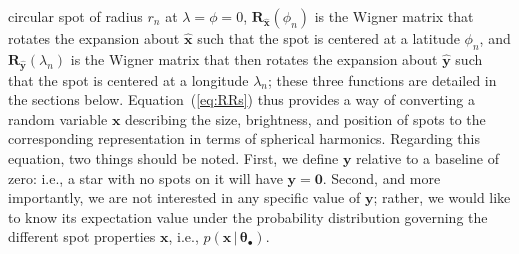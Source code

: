 \documentclass[modern]{aastex62}
\begin{document}
circular spot of radius $r_n$ at $\lambda = \phi = 0$,
$\mathbf{R}_{\hat{\mathbf{x}}}(\phi_n)$ is the Wigner matrix that rotates the
expansion about $\hat{\mathbf{x}}$ such that the spot is centered at a
latitude $\phi_n$, and $\mathbf{R}_{\hat{\mathbf{y}}}(\lambda_n)$ is the Wigner
matrix that then rotates the
expansion about $\hat{\mathbf{y}}$ such that the spot is centered at a
longitude $\lambda_n$; these three functions are detailed in the sections below.
%
Equation~(\ref{eq:RRs}) thus provides a way of converting a random variable
$\mathbf{x}$ describing the size, brightness, and position of spots to the
corresponding representation in terms of spherical harmonics.
%
Regarding this equation,
two things should be noted. First, we define $\mathbf{y}$ relative to
a baseline of zero: i.e., a star with no spots on it will have
$\mathbf{y} = \mathbf{0}$. Second, and more importantly,
we are not interested in any specific value of
$\mathbf{y}$; rather, we would like to know its expectation value under
the probability distribution governing the different spot properties $\mathbf{x}$,
i.e., $p(\mathbf{x} \, \big| \, \pmb{\theta}_\bullet)$.
%
\end{document}

